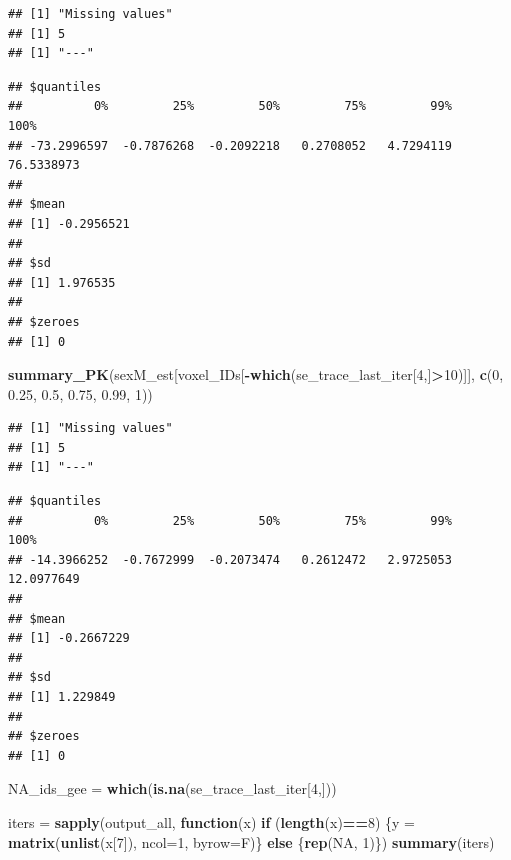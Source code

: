 \documentclass[]{article}
\newenvironment{Shaded}{\begin{snugshade}}{\end{snugshade}}
\newcommand{\ControlFlowTok}[1]{\textcolor[rgb]{0.13,0.29,0.53}{\textbf{#1}}}
\newcommand{\DataTypeTok}[1]{\textcolor[rgb]{0.13,0.29,0.53}{#1}}
\newcommand{\DecValTok}[1]{\textcolor[rgb]{0.00,0.00,0.81}{#1}}
\newcommand{\FloatTok}[1]{\textcolor[rgb]{0.00,0.00,0.81}{#1}}
\newcommand{\KeywordTok}[1]{\textcolor[rgb]{0.13,0.29,0.53}{\textbf{#1}}}
\newcommand{\NormalTok}[1]{#1}
\newcommand{\OperatorTok}[1]{\textcolor[rgb]{0.81,0.36,0.00}{\textbf{#1}}}
\newcommand{\OtherTok}[1]{\textcolor[rgb]{0.56,0.35,0.01}{#1}}
\newcommand{\StringTok}[1]{\textcolor[rgb]{0.31,0.60,0.02}{#1}}
\begin{document}
\begin{verbatim}
## [1] "Missing values"
## [1] 5
## [1] "---"
\end{verbatim}

\begin{verbatim}
## $quantiles
##          0%         25%         50%         75%         99%        100% 
## -73.2996597  -0.7876268  -0.2092218   0.2708052   4.7294119  76.5338973 
## 
## $mean
## [1] -0.2956521
## 
## $sd
## [1] 1.976535
## 
## $zeroes
## [1] 0
\end{verbatim}

\begin{Shaded}
\begin{Highlighting}[]
\KeywordTok{summary_PK}\NormalTok{(sexM_est[voxel_IDs[}\OperatorTok{-}\KeywordTok{which}\NormalTok{(se_trace_last_iter[}\DecValTok{4}\NormalTok{,]}\OperatorTok{>}\DecValTok{10}\NormalTok{)]],  }\KeywordTok{c}\NormalTok{(}\DecValTok{0}\NormalTok{, }\FloatTok{0.25}\NormalTok{, }\FloatTok{0.5}\NormalTok{, }\FloatTok{0.75}\NormalTok{, }\FloatTok{0.99}\NormalTok{, }\DecValTok{1}\NormalTok{))}
\end{Highlighting}
\end{Shaded}

\begin{verbatim}
## [1] "Missing values"
## [1] 5
## [1] "---"
\end{verbatim}

\begin{verbatim}
## $quantiles
##          0%         25%         50%         75%         99%        100% 
## -14.3966252  -0.7672999  -0.2073474   0.2612472   2.9725053  12.0977649 
## 
## $mean
## [1] -0.2667229
## 
## $sd
## [1] 1.229849
## 
## $zeroes
## [1] 0
\end{verbatim}

\begin{Shaded}
\begin{Highlighting}[]
\NormalTok{NA_ids_gee =}\StringTok{ }\KeywordTok{which}\NormalTok{(}\KeywordTok{is.na}\NormalTok{(se_trace_last_iter[}\DecValTok{4}\NormalTok{,]))}

\NormalTok{iters =}\StringTok{ }\KeywordTok{sapply}\NormalTok{(output_all, }\ControlFlowTok{function}\NormalTok{(x) }\ControlFlowTok{if}\NormalTok{ (}\KeywordTok{length}\NormalTok{(x)}\OperatorTok{==}\DecValTok{8}\NormalTok{) \{y =}\StringTok{ }\KeywordTok{matrix}\NormalTok{(}\KeywordTok{unlist}\NormalTok{(x[}\DecValTok{7}\NormalTok{]), }\DataTypeTok{ncol=}\DecValTok{1}\NormalTok{, }\DataTypeTok{byrow=}\NormalTok{F)\} }\ControlFlowTok{else}\NormalTok{ \{}\KeywordTok{rep}\NormalTok{(}\OtherTok{NA}\NormalTok{, }\DecValTok{1}\NormalTok{)\})}
\KeywordTok{summary}\NormalTok{(iters)}
\end{Highlighting}
\end{Shaded}
\end{document}
